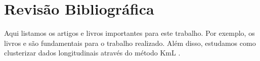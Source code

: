 \chapter{Revisão Bibliográfica}\label{revisaobibliografica}

Aqui listamos os artigos e livros importantes para este trabalho. Por exemplo, os livros  e  são fundamentais para o trabalho realizado. Além disso, estudamos como clusterizar dados longitudinais através do método KmL \cite{Genolini2009}.

